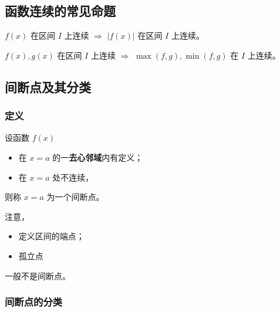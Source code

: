 \subsection{函数连续的常见命题}

\begin{Field}[连续命题1]

    $ f(x) $ 在区间 $ I $ 上连续 $ \Rightarrow $ $ |f(x)| $ 在区间 $ I $ 上连续。
\end{Field}

\begin{Field}[连续命题2]

    $ f(x),g(x)$ 在区间 $ I $ 上连续 $ \Rightarrow $ $ \max(f,g),\min(f,g) $ 在 $ I $ 上连续。
\end{Field}

\subsection{间断点及其分类}

\subsubsection{定义}

\begin{Def}[间断点]

    设函数 $ f(x) $ 
    \begin{itemize}
        \item 在 $ x=a $ 的一\textbf{去心邻域}内有定义；
        \item 在 $ x=a $ 处不连续，
    \end{itemize}
    则称 $ x=a $ 为一个间断点。
\end{Def}

注意，
\begin{itemize}
    \item 定义区间的端点；
    \item 孤立点
\end{itemize}
一般不是间断点。

\subsubsection{间断点的分类}

